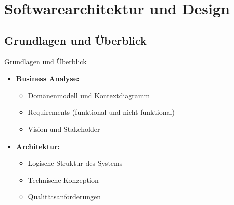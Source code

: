 \section{Softwarearchitektur und Design}

\subsection{Grundlagen und Überblick}

\begin{concept}{Grundlagen und Überblick}
\begin{itemize}
    \item \textbf{Business Analyse:}
    \begin{itemize}
        \item Domänenmodell und Kontextdiagramm
        \item Requirements (funktional und nicht-funktional)
        \item Vision und Stakeholder
    \end{itemize}
    
    \item \textbf{Architektur:}
    \begin{itemize}
        \item Logische Struktur des Systems
        \item Technische Konzeption
        \item Qualitätsanforderungen
    \end{itemize}
    

\end{itemize}
\end{concept}
